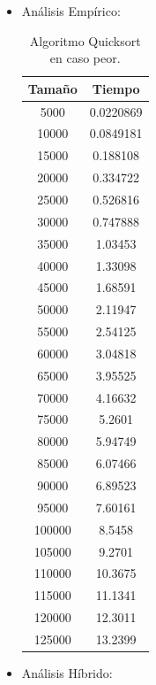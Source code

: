 \documentclass[a4paper,12pt,twoside]{article} %
\begin{document}
\begin{itemize}
	
		\item Análisis Empírico:
		
\begin{table}[h]
	\begin{center}
		\begin{tabular}{|c|c|}
		\hline
		Tamaño & Tiempo \\
		\hline
		5000 & 0.0220869 \\
		10000 & 0.0849181 \\
		15000 & 0.188108 \\
		20000 & 0.334722 \\
		25000 & 0.526816 \\
		30000 & 0.747888 \\
		35000 & 1.03453 \\
		40000 & 1.33098 \\
		45000 & 1.68591 \\
		50000 & 2.11947 \\
		55000 & 2.54125 \\
		60000 & 3.04818 \\
		65000 & 3.95525 \\
		70000 & 4.16632 \\
		75000 & 5.2601 \\
		80000 & 5.94749 \\
		85000 & 6.07466 \\
		90000 & 6.89523 \\
		95000 & 7.60161 \\
		100000 & 8.5458 \\
		105000 & 9.2701 \\
		110000 & 10.3675 \\
		115000 & 11.1341 \\
		120000 & 12.3011 \\
		125000 & 13.2399 \\
		\hline
		\end{tabular}
	\end{center}
	\caption{Algoritmo Quicksort en caso peor.}
\end{table}

\newpage
		
		\item Análisis Híbrido:
		
\begin{figure}[h]
  \begin{center}
  

\end{center}
\end{figure}
\end{itemize}
\end{document}
